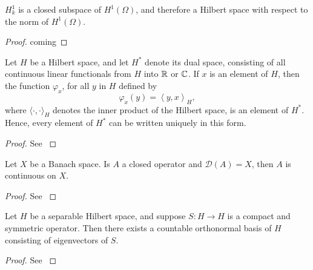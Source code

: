 \begin{atheorem}
	$H^{1}_{k}$ is a closed subspace of $H^{1}(\Omega)$, and therefore a  Hilbert space with respect to the norm of $H^{1}(\Omega)$.
	
	\begin{proof} %
		coming
	\end{proof}
\end{atheorem}

\begin{atheorem} %
	Let $H$ be a Hilbert space, and let $H^{*}$ denote its dual space, consisting of all continuous linear functionals from $H$ into $\mathbb{R}$ or $\mathbb{C}$. If $x$ is an element of $H$, then the function $\varphi_{x}$, for all $y$ in $H$ defined by
	\[ \varphi_{x}(y) = \left\langle y,x\right\rangle_{H}, \]
	where $\langle \cdot ,\cdot \rangle_{H}$ denotes the inner product of the Hilbert space, is an element of $H^{*}$. Hence, every element of $H^{*}$ can be written uniquely in this form.
	\begin{proof}
		See \cite[p. 88]{weis2015funkana}
	\end{proof}
\end{atheorem}

\begin{atheorem}
	Let $X$ be a Banach space. Is $A$ a closed operator and $\mathcal{D}(A) = X$, then $A$ is continuous on $X$.
	\begin{proof}
		See \cite[p. 66]{weis2015funkana}
	\end{proof}
\end{atheorem}

\begin{atheorem}
	Let $H$ be a separable Hilbert space, and suppose $S \colon H \rightarrow H$ is a compact and symmetric operator. Then there exists a countable orthonormal basis of $H$ consisting of eigenvectors of $S$.
	
	\begin{proof}
		See \cite[p. 645]{evans1998partial}
	\end{proof}
\end{atheorem}


